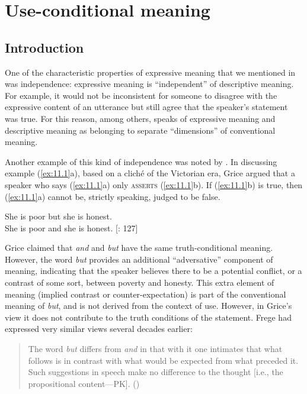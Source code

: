 \chapter{Use-conditional meaning}\label{sec:11}

\section{Introduction}\label{sec:11.1}

One of the characteristic properties of expressive meaning that we mentioned in  was independence: expressive meaning is “independent” of descriptive meaning. For example, it would not be inconsistent for someone to disagree with the expressive content of an utterance but still agree that the speaker’s statement was true. For this reason, among others, \citet{Potts2007c} speaks of expressive meaning and descriptive meaning as belonging to separate “dimensions” of conventional meaning.


Another example of this kind of independence was noted by \citet{Grice1961}. In discussing example (\ref{ex:11.1}a), based on a cliché of the Victorian era, Grice argued that a speaker who says (\ref{ex:11.1}a) only \textsc{asserts} (\ref{ex:11.1}b). If (\ref{ex:11.1}b) is true, then (\ref{ex:11.1}a) cannot be, strictly speaking, judged to be false.



\ea \label{ex:11.1}
\ea She is poor but she is honest.\\
\ex She is poor and she is honest.  [\citealt{Grice1961}: 127]
                       \z
\z


Grice claimed that \textit{and} and \textit{but} have the same truth-conditional meaning. However, the word \textit{but} provides an additional “adversative” component of meaning, indicating that the speaker believes there to be a potential conflict, or a contrast of some sort, between poverty and honesty. This extra element of meaning (implied contrast or counter-expectation) is part of the conventional meaning of \textit{but}, and is not derived from the context of use. However, in Grice’s view it does not contribute to the truth conditions of the statement. Frege had expressed very similar views several decades earlier:


\begin{quote}
The word \textit{but} differs from \textit{and} in that with it one intimates that what follows is in contrast with what would be expected from what preceded it. Such suggestions in speech make no difference to the thought [i.e., the propositional content—PK].   (\citealt{Frege1918})
\end{quote}



